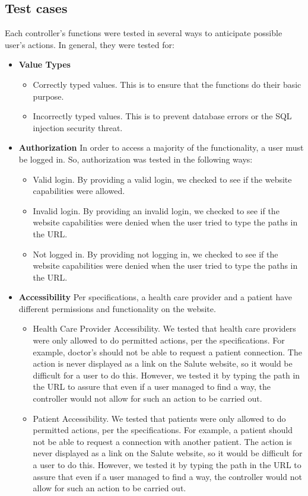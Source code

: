 \subsection{Test cases}

Each controller's functions were tested in several ways to anticipate possible user's actions. In general, they were tested for:
\begin{itemize}
\item \textbf{Value Types}
\begin{itemize}
\item Correctly typed values. This is to ensure that the functions do their basic purpose.
\item Incorrectly typed values. This is to prevent database errors or the SQL injection security threat.
\end{itemize}
\item \textbf{Authorization} In order to access a majority of the functionality, a user must be logged in. So, authorization was tested in the following ways: 
\begin{itemize}
\item  Valid login. By providing a valid login, we checked to see if the website capabilities were allowed. 
\item Invalid login. By providing an invalid login, we checked to see if the website capabilities were denied when the user tried to type the paths in the URL.
\item Not logged in. By providing not logging in, we checked to see if the website capabilities were denied when the user tried to type the paths in the URL.
\end{itemize}
\item\textbf{Accessibility} Per specifications, a health care provider and a patient have different permissions and functionality on the website. 
\begin{itemize}
\item Health Care Provider Accessibility. We tested that health care providers were only allowed to do permitted actions, per the specifications. For example, doctor's should not be able to request a patient connection. The action is never displayed as a link on the Salute website, so it would be difficult for a user to do this. However, we tested it by typing the path in the URL to assure that even if a user managed to find a way, the controller would not allow for such an action to be carried out. 
\item Patient Accessibility. We tested that patients were only allowed to do permitted actions, per the specifications. For example, a patient should not be able to request a connection with another patient. The action is never displayed as a link on the Salute website, so it would be difficult for a user to do this. However, we tested it by typing the path in the URL to assure that even if a user managed to find a way, the controller would not allow for such an action to be carried out. 

\end{itemize}
\end{itemize}
